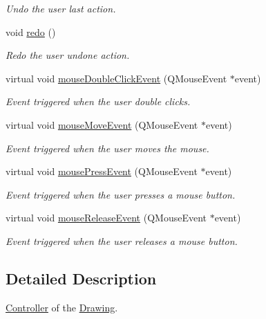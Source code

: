 \begin{DoxyCompactItemize}
\begin{DoxyCompactList}\small\item\em Undo the user last action. \end{DoxyCompactList}\item 
\hypertarget{classDrawingController_affc95bcb0be797c3c6561cdde4cd04ff}{}void \hyperlink{classDrawingController_affc95bcb0be797c3c6561cdde4cd04ff}{redo} ()\label{classDrawingController_affc95bcb0be797c3c6561cdde4cd04ff}

\begin{DoxyCompactList}\small\item\em Redo the user undone action. \end{DoxyCompactList}\item 
virtual void \hyperlink{classDrawingController_a960da6dbddf8bbe4ebcec3e6394ba8ec}{mouse\+Double\+Click\+Event} (Q\+Mouse\+Event $\ast$event)
\begin{DoxyCompactList}\small\item\em Event triggered when the user double clicks. \end{DoxyCompactList}\item 
virtual void \hyperlink{classDrawingController_ac211d777a6ee36e2e613966c658a3905}{mouse\+Move\+Event} (Q\+Mouse\+Event $\ast$event)
\begin{DoxyCompactList}\small\item\em Event triggered when the user moves the mouse. \end{DoxyCompactList}\item 
virtual void \hyperlink{classDrawingController_a777b2c7b8f3a7569ced2bb68ddfc0cf3}{mouse\+Press\+Event} (Q\+Mouse\+Event $\ast$event)
\begin{DoxyCompactList}\small\item\em Event triggered when the user presses a mouse button. \end{DoxyCompactList}\item 
virtual void \hyperlink{classDrawingController_a199281e54f2914bec1d78109313e1423}{mouse\+Release\+Event} (Q\+Mouse\+Event $\ast$event)
\begin{DoxyCompactList}\small\item\em Event triggered when the user releases a mouse button. \end{DoxyCompactList}\end{DoxyCompactItemize}


\subsection{Detailed Description}
\hyperlink{classController}{Controller} of the \hyperlink{classDrawing}{Drawing}. 

